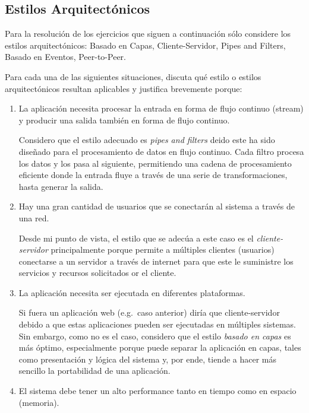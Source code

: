 	\subsection{Estilos Arquitectónicos}

	Para la resolución de los ejercicios que siguen a continuación sólo
	considere los estilos arquitectónicos: Basado en Capas, Cliente-Servidor,
	Pipes and Filters, Basado en Eventos, Peer-to-Peer.

	Para cada una de las siguientes situaciones, discuta qué estilo o estilos
	arquitectónicos resultan aplicables y justifica brevemente porque:

	\begin{enumerate}
		\item La aplicación necesita procesar la entrada en forma de flujo
			continuo (stream) y producir una salida también en forma de flujo
			continuo.

			Considero que el estilo adecuado es \emph{pipes and filters}
			deido este ha sido diseñado para el procesamiento de datos en
			flujo continuo. Cada filtro procesa los datos y los pasa al siguiente,
			permitiendo una cadena de procesamiento eficiente donde la
			entrada fluye a través de una serie de transformaciones, hasta generar
			la salida.

		\item Hay una gran cantidad de usuarios que se conectarán al sistema
			a través de una red.

			Desde mi punto de vista, el estilo que se adecúa a este caso es
			el \emph{cliente-servidor} principalmente porque permite a múltiples
			clientes (usuarios) conectarse a un servidor a través de internet
			para que este le suministre los servicios y recursos solicitados
			or el cliente.

		\item La aplicación necesita ser ejecutada en diferentes plataformas.

			Si fuera un aplicación web (e.g.~caso anterior) diría que
			cliente-servidor debido a que estas aplicaciones pueden ser
			ejecutadas en múltiples sistemas. Sin embargo, como no es el
			caso, considero que el estilo \emph{basado en capas} es más
			óptimo, especialmente porque puede separar la aplicación en capas,
			tales como presentación y lógica del sistema y, por ende,
			tiende a hacer más sencillo la portabilidad de una aplicación.

		\item El sistema debe tener un alto performance tanto en tiempo como
			en espacio (memoria).


\end{enumerate}
